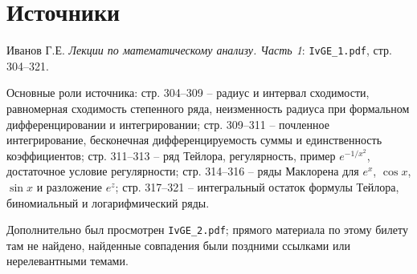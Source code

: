 \documentclass[12pt,a4paper]{article}
\begin{document}
\section*{Источники}

Иванов Г.Е. \emph{Лекции по математическому анализу. Часть 1}:
\texttt{IvGE\_1.pdf}, стр. 304--321.

Основные роли источника: стр. 304--309 -- радиус и интервал сходимости,
равномерная сходимость степенного ряда, неизменность радиуса при формальном
дифференцировании и интегрировании; стр. 309--311 -- почленное
интегрирование, бесконечная дифференцируемость суммы и единственность
коэффициентов; стр. 311--313 -- ряд Тейлора, регулярность, пример
\(e^{-1/x^2}\), достаточное условие регулярности; стр. 314--316 -- ряды
Маклорена для \(e^x\), \(\cos x\), \(\sin x\) и разложение \(e^z\);
стр. 317--321 -- интегральный остаток формулы Тейлора, биномиальный и
логарифмический ряды.

Дополнительно был просмотрен \texttt{IvGE\_2.pdf}; прямого материала по этому
билету там не найдено, найденные совпадения были поздними ссылками или
нерелевантными темами.
\end{document}
